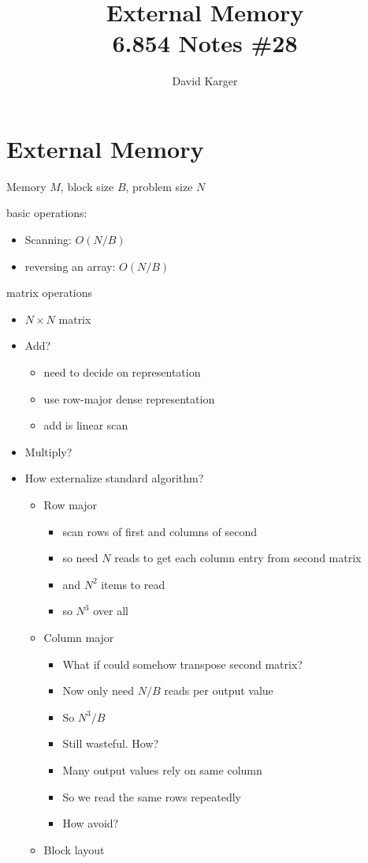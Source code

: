 \documentclass{article}
\title{External Memory\\ 6.854 Notes \#28}
\author{David Karger}
\begin{document}
\section*{External Memory}

Memory $M$, block size $B$, problem size $N$

basic operations:
\begin{itemize}
\item Scanning: $O(N/B)$
\item reversing an array: $O(N/B)$
\end{itemize}

matrix operations
\begin{itemize}
\item $N\times N$ matrix
\item Add?
\begin{itemize}
\item need to decide on representation
\item use row-major dense representation
\item add is linear scan
\end{itemize}
\item Multiply?
\item How externalize standard algorithm?
\begin{itemize}
\item Row major
\begin{itemize}
\item scan rows of first and columns of second
\item so need $N$ reads to get each column entry from second matrix
\item and $N^2$ items to read
\item so $N^3$ over all
\end{itemize}
\item Column major
\begin{itemize}
\item What if could somehow transpose second matrix?
\item Now only need $N/B$ reads per output value
\item So $N^3/B$
\item Still wasteful. How?
\item Many output values rely on same column
\item So we read the same rows repeatedly
\item How avoid?
\end{itemize}
\item Block layout
\begin{itemize}

\end{itemize}
\end{itemize}
\end{itemize}
\end{document}
